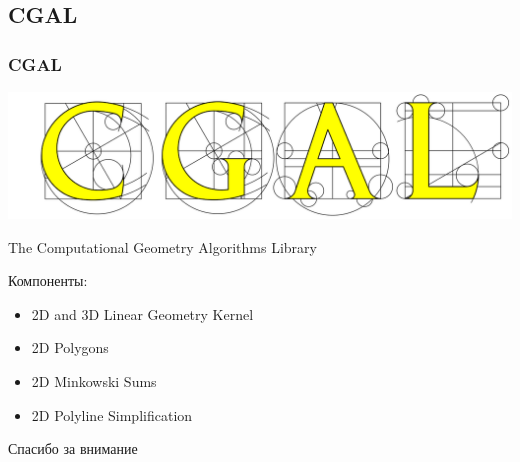 \documentclass{beamer}
\begin{document}

  \subsection{CGAL} 
  
  \begin{frame}
    \frametitle{CGAL}
    \includegraphics[width=1.0\textwidth]{cgal-logo}

    The Computational Geometry Algorithms Library

    Компоненты:

    \begin{itemize}
        \item 2D and 3D Linear Geometry Kernel
        \item 2D Polygons
        \item 2D Minkowski Sums
        \item 2D Polyline Simplification
    \end{itemize}

    \end{frame}

  \begin{frame}
  \Huge{\centerline{Спасибо за внимание}}
  \end{frame}
  
  
  
\end{document}
